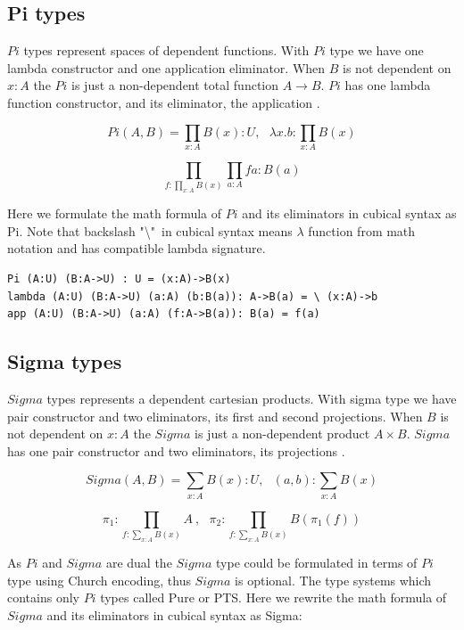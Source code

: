 \documentclass{article}
\begin{document}
\subsection{Pi types}

$Pi$ types represent spaces of dependent functions.
With $Pi$ type we have one lambda constructor
and one application eliminator. When $B$ is not dependent on $x:A$
the $Pi$ is just a non-dependent total function $A \rightarrow B$.
$Pi$ has one lambda function constructor, and its eliminator, the
application \cite{HoTT, Lof72, Lof84, Hofmann96, Mortberg17, Ulf09}.

$$Pi(A,B) = \prod_{x:A} B(x) : U,\ \ \ 
  \lambda x . b : \prod_{x:A} B(x)$$

$$\prod_{f:\prod_{x:A}B(x)}\prod_{a:A} f a : B (a)$$

Here we formulate the math formula of $Pi$ and its eliminators in cubical syntax as Pi.
Note that backslash "\textbackslash"\  in cubical syntax means $\lambda$ function from math notation
and has compatible lambda signature.

\begin{lstlisting}[mathescape=true]
Pi (A:U) (B:A->U) : U = (x:A)->B(x)
lambda (A:U) (B:A->U) (a:A) (b:B(a)): A->B(a) = \ (x:A)->b
app (A:U) (B:A->U) (a:A) (f:A->B(a)): B(a) = f(a)
\end{lstlisting}

\subsection{Sigma types}

$Sigma$ types represents a dependent cartesian products.
With sigma type we have pair constructor and two eliminators,
its first and second projections. When $B$ is not dependent on $x:A$
the $Sigma$ is just a non-dependent product $A \times B$.
$Sigma$ has one pair constructor and two eliminators, its projections
\cite{HoTT, Lof72, Lof84, Hofmann96, Mortberg17, Ulf09}.

$$Sigma(A,B) = \sum_{x:A} B(x) : U,\ \ \ 
  (a,b) : \sum_{x:A} B(x)$$

$$\pi_1 : \prod_{f:\sum_{x:A}B(x)}A\ ,\ \ \ \pi_2 : \prod_{f:\sum_{x:A}B(x)}B(\pi_1(f))$$

As $Pi$ and $Sigma$ are dual the $Sigma$ type could be formulated
in terms of $Pi$ type using Church encoding, thus $Sigma$ is optional.
The type systems which contains only $Pi$ types called Pure or PTS.
Here we rewrite the math formula of $Sigma$ and its eliminators in cubical syntax as Sigma:
\end{document}
